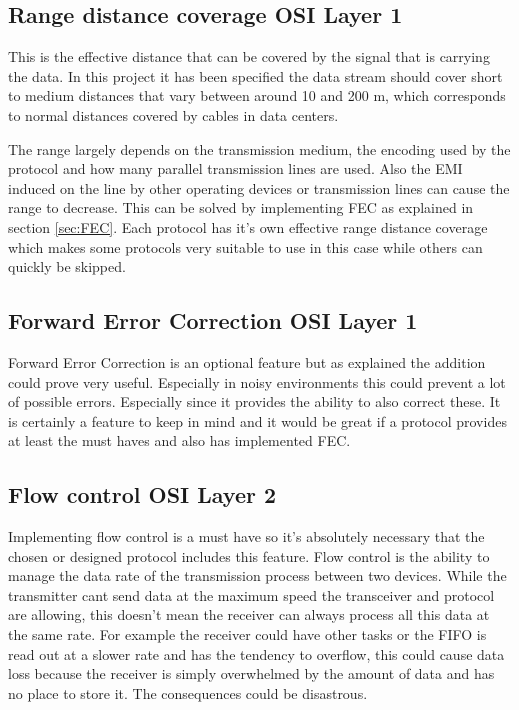 \subsection[Range distance coverage]{Range distance coverage \hfill OSI Layer 1}
This is the effective distance that can be covered by the signal that is carrying the data. In this project it has been specified the data stream should cover short to medium distances that vary between around 10 and 200 m, which corresponds to normal distances covered by cables in data centers.

The range largely depends on the transmission medium, the encoding used by the protocol and how many parallel transmission lines are used. Also the EMI induced on the line by other operating devices or transmission lines can cause the range to decrease. This can be solved by implementing FEC as explained in section \ref{sec:FEC}. Each protocol has it's own effective range distance coverage which makes some protocols very suitable to use in this case while others can quickly be skipped.

\subsection[Forward Error Correction]{Forward Error Correction \hfill OSI Layer 1}
Forward Error Correction is an optional feature but as explained the addition could prove very useful. Especially in noisy environments this could prevent a lot of possible errors. Especially since it provides the ability to also correct these. It is certainly a feature to keep in mind and it would be great if a protocol provides at least the must haves and also has implemented FEC.

\subsection[Flow control]{Flow control \hfill OSI Layer 2}
Implementing flow control is a must have so it's absolutely necessary that the chosen or designed protocol includes this feature. Flow control is the ability to manage the data rate of the transmission process between two devices. While the transmitter cant send data at the maximum speed the transceiver and protocol are allowing, this doesn't mean the receiver can always process all this data at the same rate. For example the receiver could have other tasks or the FIFO is read out at a slower rate and has the tendency to overflow, this could cause data loss because the receiver is simply overwhelmed by the amount of data and has no place to store it. The consequences could be disastrous.

